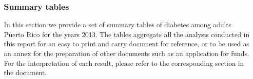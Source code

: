 \newpage
\subsubsection{Summary tables}
In this section we provide a set of summary tables of diabetes among adults Puerto Rico for the years 2013. The tables aggregate all the analysis conducted in this report for an easy to print and carry document for reference, or to be used as an annex for the preparation of other documents such as an application for funds. For the interpretation of each result, please refer to the corresponding section in the document.


